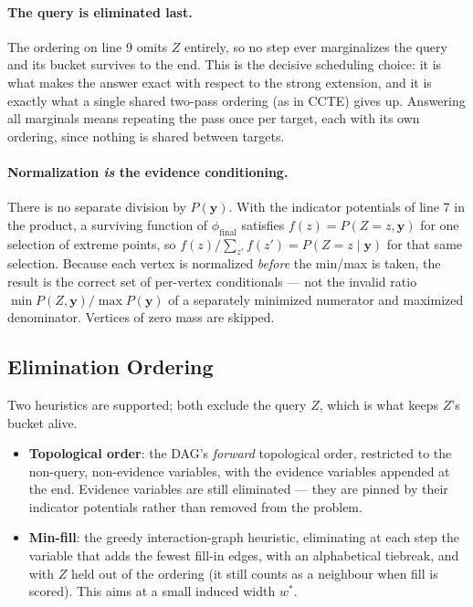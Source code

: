 \documentclass[11pt]{article}
\theoremstyle{definition}
\newcommand{\by}{\mathbf{y}}
\begin{document}
\paragraph{The query is eliminated last.}\label{sec:querylast}
The ordering on line 9 omits $Z$ entirely, so no step ever marginalizes the query
and its bucket survives to the end. This is the decisive scheduling choice: it is
what makes the answer exact with respect to the strong extension, and it is
exactly what a single shared two-pass ordering (as in CCTE) gives up. Answering
all marginals means repeating the pass once per target, each with its own
ordering, since nothing is shared between targets.

\paragraph{Normalization \emph{is} the evidence conditioning.}
There is no separate division by $P(\by)$. With the indicator potentials of
line 7 in the product, a surviving function of $\phi_{\mathrm{final}}$ satisfies
$f(z) = P(Z{=}z, \by)$ for one selection of extreme points, so
$f(z) / \sum_{z'} f(z') = P(Z{=}z \mid \by)$ for that same selection. Because
each vertex is normalized \emph{before} the min/max is taken, the result is the
correct set of per-vertex conditionals --- not the invalid ratio
$\min P(Z,\by) / \max P(\by)$ of a separately minimized numerator and maximized
denominator. Vertices of zero mass are skipped.

\subsection{Elimination Ordering}

Two heuristics are supported; both exclude the query $Z$, which is what keeps
$Z$'s bucket alive.

\begin{itemize}
  \item \textbf{Topological order}: the DAG's \emph{forward} topological order,
        restricted to the non-query, non-evidence variables, with the evidence
        variables appended at the end. Evidence variables are still eliminated
        --- they are pinned by their indicator potentials rather than removed
        from the problem.
  \item \textbf{Min-fill}: the greedy interaction-graph heuristic, eliminating at
        each step the variable that adds the fewest fill-in edges, with an
        alphabetical tiebreak, and with $Z$ held out of the ordering (it still
        counts as a neighbour when fill is scored). This aims at a small induced
        width $w^*$.
\end{itemize}
\end{document}
